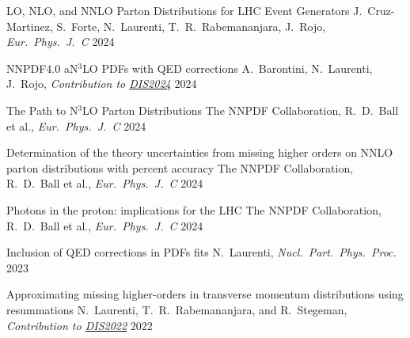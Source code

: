 
\begin{cvhonors}


    \cvhonor
    {LO, NLO, and NNLO Parton Distributions for LHC Event Generators} %
    {J.~Cruz-Martinez, S.~Forte, N.~Laurenti, T.~R.~Rabemananjara, J.~Rojo, \emph{Eur.\ Phys.\ J.\ C}} %
    {\vspace{0.35cm}\href{https://inspirehep.net/literature/2800507}{}}
    {\vspace{0.35cm}2024}

    \cvhonor
    {NNPDF4.0 aN$^3$LO PDFs with QED corrections} %
    {A.~Barontini, N.~Laurenti, J.~Rojo, \emph{Contribution to \href{https://inspirehep.net/conferences/2667502?ui-citation-summary=true}{DIS2024}}} %
    {\href{https://inspirehep.net/literature/2794583}{}}
    {2024}
    
    \cvhonor
    {The Path to N$^3$LO Parton Distributions} %
    {The NNPDF Collaboration, R.~D.~Ball et al., \emph{Eur.\ Phys.\ J.\ C}} %
    {\href{https://inspirehep.net/literature/2762925}{}}
    {2024}
    
    \cvhonor
    {Determination of the theory uncertainties from missing higher orders on NNLO parton distributions with percent accuracy} %
    {The NNPDF Collaboration, R.~D.~Ball et al., \emph{Eur.\ Phys.\ J.\ C}} %
    {\vspace{0.35cm}\href{https://inspirehep.net/literature/2749502}{}}
    {\vspace{0.35cm}2024}
    
    \cvhonor
    {Photons in the proton: implications for the LHC} %
    {The NNPDF Collaboration, R.~D.~Ball et al., \emph{Eur.\ Phys.\ J.\ C}} %
    {\href{https://inspirehep.net/literature/2747770}{}}
    {2024}

    \cvhonor
    {Inclusion of QED corrections in PDFs ﬁts}
    {N.~Laurenti, \textit{Nucl.\ Part.\ Phys.\ Proc.}}
    {\href{https://doi.org/10.1016/j.nuclphysbps.2023.11.013}{}}
    {2023}
    
    \cvhonor
    {Approximating missing higher-orders in transverse momentum distributions using resummations}
    {N.~Laurenti, T.~R.~Rabemananjara, and R.~Stegeman, \emph{Contribution to \href{https://inspirehep.net/conferences/1914506?ui-citation-summary=true}{DIS2022}}}
    {\vspace{0.35cm}\href{https://inspirehep.net/literature/2122473}{}}
    {\vspace{0.35cm}2022}

\end{cvhonors}